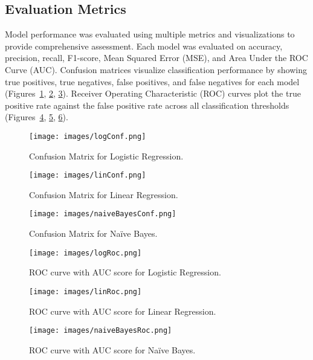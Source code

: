 \documentclass[conference]{IEEEtran}
\begin{document}
\subsection{Evaluation Metrics}
Model performance was evaluated using multiple metrics and visualizations to provide comprehensive assessment. Each model was evaluated on accuracy, precision, recall, F1-score, Mean Squared Error (MSE), and Area Under the ROC Curve (AUC). Confusion matrices visualize classification performance by showing true positives, true negatives, false positives, and false negatives for each model (Figures~\ref{fig:log_confusion}, \ref{fig:lin_confusion}, \ref{fig:nb_confusion}). Receiver Operating Characteristic (ROC) curves plot the true positive rate against the false positive rate across all classification thresholds (Figures~\ref{fig:log_roc}, \ref{fig:lin_roc}, \ref{fig:nb_roc}).

\begin{figure}[!h]
\centering
\texttt{[image: images/logConf.png]}
\caption{Confusion Matrix for Logistic Regression.}
\label{fig:log_confusion}
\end{figure}

\begin{figure}[!h]
\centering
\texttt{[image: images/linConf.png]}
\caption{Confusion Matrix for Linear Regression.}
\label{fig:lin_confusion}
\end{figure}

\begin{figure}[!h]
\centering
\texttt{[image: images/naiveBayesConf.png]}
\caption{Confusion Matrix for Naïve Bayes.}
\label{fig:nb_confusion}
\end{figure}

\begin{figure}[!h]
\centering
\texttt{[image: images/logRoc.png]}
\caption{ROC curve with AUC score for Logistic Regression.}
\label{fig:log_roc}
\end{figure}

\begin{figure}[!h]
\centering
\texttt{[image: images/linRoc.png]}
\caption{ROC curve with AUC score for Linear Regression.}
\label{fig:lin_roc}
\end{figure}

\begin{figure}[!h]
\centering
\texttt{[image: images/naiveBayesRoc.png]}
\caption{ROC curve with AUC score for Naïve Bayes.}
\label{fig:nb_roc}
\end{figure}
\end{document}
